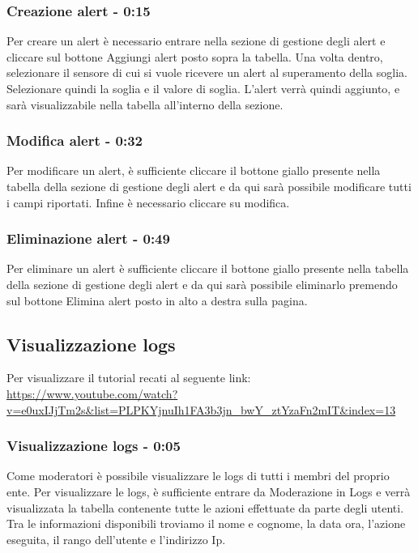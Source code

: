 	\subsubsection{Creazione alert - 0:15}
		Per creare un alert è necessario entrare nella sezione di gestione degli alert e cliccare sul bottone Aggiungi alert posto sopra la tabella.
		Una volta dentro, selezionare il sensore di cui si vuole ricevere un alert al superamento della soglia. Selezionare quindi la soglia e il valore di soglia.
		L'alert verrà quindi aggiunto, e sarà visualizzabile nella tabella all'interno della sezione.

	\subsubsection{Modifica alert - 0:32}

		Per modificare un alert, è sufficiente cliccare il bottone giallo presente nella tabella della sezione di gestione degli alert e da qui sarà possibile modificare tutti i campi riportati. Infine è necessario cliccare su modifica.

	\subsubsection{Eliminazione alert - 0:49}
		Per eliminare un alert è sufficiente cliccare il bottone giallo presente nella tabella della sezione di gestione degli alert e da qui sarà possibile eliminarlo premendo sul bottone Elimina alert posto in alto a destra sulla pagina.
	

\subsection{Visualizzazione logs}
Per visualizzare il tutorial recati al seguente link: 
\url{https://www.youtube.com/watch?v=e0uxIJjTm2s&list=PLPKYjnuIh1FA3b3jn_bwY_ztYzaFn2mIT&index=13}

	\subsubsection{Visualizzazione logs - 0:05}
		Come moderatori è possibile visualizzare le logs di tutti i membri del proprio ente.
		Per visualizzare le logs, è sufficiente entrare da Moderazione in Logs e verrà visualizzata la tabella contenente tutte le azioni effettuate da parte degli utenti.
		Tra le informazioni disponibili troviamo il nome e cognome, la data ora, l’azione eseguita, il rango dell’utente e l’indirizzo Ip. 

